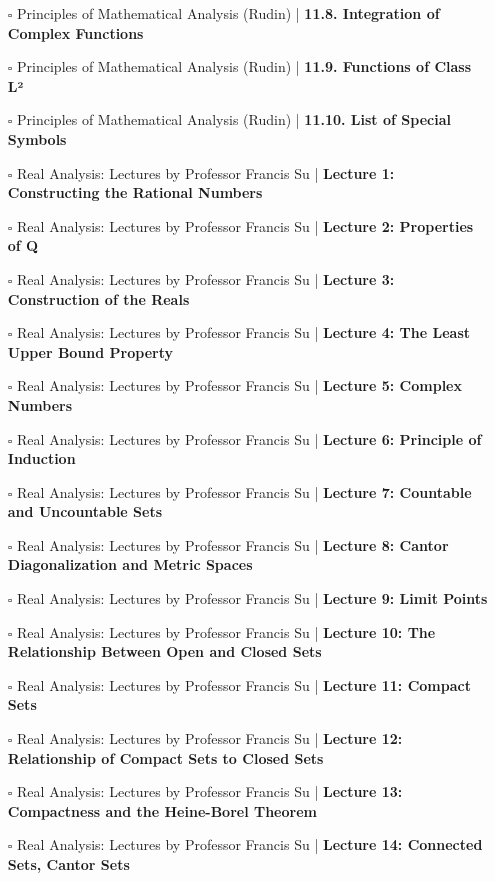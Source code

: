 \documentclass[a4, landscape, 12pt]{article}
\newcommand{\checkbox}{$\square$}%
\begin{document}
\begin{itemize}
{}
\item [\checkbox] Principles of Mathematical Analysis (Rudin)  | \textbf{11.8. Integration of Complex Functions
}
\item [\checkbox] Principles of Mathematical Analysis (Rudin)  | \textbf{11.9. Functions of Class L²
}
\item [\checkbox] Principles of Mathematical Analysis (Rudin)  | \textbf{11.10. List of Special Symbols
}
\item [\checkbox] Real Analysis: Lectures by Professor Francis Su  | \textbf{Lecture 1: Constructing the Rational Numbers
}
\item [\checkbox] Real Analysis: Lectures by Professor Francis Su  | \textbf{Lecture 2: Properties of Q
}
\item [\checkbox] Real Analysis: Lectures by Professor Francis Su  | \textbf{Lecture 3: Construction of the Reals
}
\item [\checkbox] Real Analysis: Lectures by Professor Francis Su  | \textbf{Lecture 4: The Least Upper Bound Property
}
\item [\checkbox] Real Analysis: Lectures by Professor Francis Su  | \textbf{Lecture 5: Complex Numbers
}
\item [\checkbox] Real Analysis: Lectures by Professor Francis Su  | \textbf{Lecture 6: Principle of Induction
}
\item [\checkbox] Real Analysis: Lectures by Professor Francis Su  | \textbf{Lecture 7: Countable and Uncountable Sets
}
\item [\checkbox] Real Analysis: Lectures by Professor Francis Su  | \textbf{Lecture 8: Cantor Diagonalization and Metric Spaces
}
\item [\checkbox] Real Analysis: Lectures by Professor Francis Su  | \textbf{Lecture 9: Limit Points
}
\item [\checkbox] Real Analysis: Lectures by Professor Francis Su  | \textbf{Lecture 10: The Relationship Between Open and Closed Sets
}
\item [\checkbox] Real Analysis: Lectures by Professor Francis Su  | \textbf{Lecture 11: Compact Sets
}
\item [\checkbox] Real Analysis: Lectures by Professor Francis Su  | \textbf{Lecture 12: Relationship of Compact Sets to Closed Sets
}
\item [\checkbox] Real Analysis: Lectures by Professor Francis Su  | \textbf{Lecture 13: Compactness and the Heine-Borel Theorem
}
\item [\checkbox] Real Analysis: Lectures by Professor Francis Su  | \textbf{Lecture 14: Connected Sets, Cantor Sets
}
\end{itemize}
\end{document}
